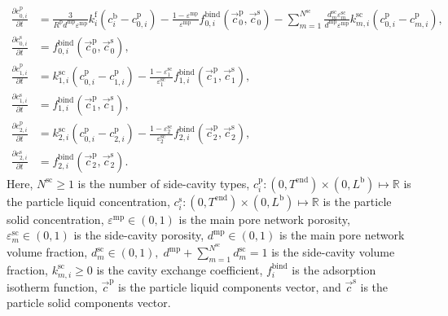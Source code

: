 \documentclass{article}
\begin{document}
\begin{align}
    \frac{\partial c^{\mathrm{p}}_{0,i}}{\partial t}
    &= \frac{3}{R^{\mathrm{p}} d^{\mathrm{mp}} \varepsilon^{\mathrm{mp}}} k^{\mathrm{f}}_{i} \left( c^{\mathrm{b}}_{i} - c^{\mathrm{p}}_{0,i} \right)
        - \frac{1 - \varepsilon^{\mathrm{mp}}}{\varepsilon^{\mathrm{mp}}}f^{\mathrm{bind}}_{0,i}\left( \vec{c}^{\mathrm{p}}_{0}, \vec{c}^{\mathrm{s}}_{0} \right)
        - \sum_{m=1}^{N^{\mathrm{sc}}} \frac{d^{\mathrm{sc}}_{m} \varepsilon^{\mathrm{sc}}_{m}}{d^{\mathrm{mp}} \varepsilon^{\mathrm{mp}}} k^{\mathrm{sc}}_{m,i} \left( c^{\mathrm{p}}_{0,i} - c^{\mathrm{p}}_{m,i} \right),
    \\
    \frac{\partial c^{\mathrm{s}}_{0,i}}{\partial t}
    &= f^{\mathrm{bind}}_{0,i}\left( \vec{c}^{\mathrm{p}}_{0}, \vec{c}^{\mathrm{s}}_{0} \right),
    \\
    \frac{\partial c^{\mathrm{p}}_{1,i}}{\partial t}
    &= k^{\mathrm{sc}}_{1,i} \left( c^{\mathrm{p}}_{0,i} - c^{\mathrm{p}}_{1,i} \right)
        - \frac{1 - \varepsilon^{\mathrm{sc}}_{1}}{\varepsilon^{\mathrm{sc}}_{1}} f^{\mathrm{bind}}_{1,i}\left( \vec{c}^{\mathrm{p}}_{1}, \vec{c}^{\mathrm{s}}_{1} \right),
    \\
    \frac{\partial c^{\mathrm{s}}_{1,i}}{\partial t}
    &= f^{\mathrm{bind}}_{1,i}\left( \vec{c}^{\mathrm{p}}_{1}, \vec{c}^{\mathrm{s}}_{1} \right),
    \\
    \frac{\partial c^{\mathrm{p}}_{2,i}}{\partial t}
    &= k^{\mathrm{sc}}_{2,i} \left( c^{\mathrm{p}}_{0,i} - c^{\mathrm{p}}_{2,i} \right)
        - \frac{1 - \varepsilon^{\mathrm{sc}}_{2}}{\varepsilon^{\mathrm{sc}}_{2}} f^{\mathrm{bind}}_{2,i}\left( \vec{c}^{\mathrm{p}}_{2}, \vec{c}^{\mathrm{s}}_{2} \right),
    \\
    \frac{\partial c^{\mathrm{s}}_{2,i}}{\partial t}
    &= f^{\mathrm{bind}}_{2,i}\left( \vec{c}^{\mathrm{p}}_{2}, \vec{c}^{\mathrm{s}}_{2} \right).
\end{align}
Here, $N^{\mathrm{sc}}\geq 1$ is the number of side-cavity types, $c^{\mathrm{p}}_{i}\colon (0, T^{\mathrm{end}}) \times (0, L^{\mathrm{b}}) \mapsto \mathbb{R}$ is the particle liquid concentration, $c^{\mathrm{s}}_{i}\colon (0, T^{\mathrm{end}}) \times (0, L^{\mathrm{b}}) \mapsto \mathbb{R}$ is the particle solid concentration, $\varepsilon^{\mathrm{mp}}\in (0, 1)$ is the main pore network porosity, $\varepsilon^{\mathrm{sc}}_{m}\in (0, 1)$ is the side-cavity porosity, $d^{\mathrm{mp}}\in (0, 1)$ is the main pore network volume fraction, $d^{\mathrm{sc}}_{m}\in (0, 1), \; d^{\mathrm{mp}} + \sum_{m=1}^{N^{\mathrm{sc}}} d^{\mathrm{sc}}_{m} = 1$ is the side-cavity volume fraction, $k^{\mathrm{sc}}_{m,i}\geq 0$ is the cavity exchange coefficient, $f^{\mathrm{bind}}_{i}$ is the adsorption isotherm function, $\vec{c}^{\mathrm{p}}$ is the particle liquid components vector, and $\vec{c}^{\mathrm{s}}$ is the particle solid components vector.
\end{document}
